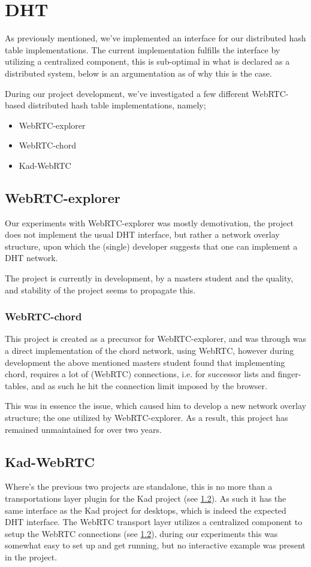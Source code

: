 \section{DHT}

As previously mentioned, we've implemented an interface for our distributed
hash table implementations. The current implementation fulfills the interface
by utilizing a centralized component, this is sub-optimal in what is declared
as a distributed system, below is an argumentation as of why this is the case.

During our project development, we've investigated a few different WebRTC-based
distributed hash table implementations, namely;
\begin{itemize}
\item WebRTC-explorer
\item WebRTC-chord
\item Kad-WebRTC
\end{itemize}

\subsection{WebRTC-explorer}
Our experiments with WebRTC-explorer was mostly demotivation, the project does
not implement the usual DHT interface, but rather a network overlay structure,
upon which the (single) developer suggests that one can implement a DHT network.

The project is currently in development, by a masters student and the quality,
and stability of the project seems to propagate this.

\subsubsection{WebRTC-chord}
This project is created as a precursor for WebRTC-explorer, and was through was
a direct implementation of the chord network, using WebRTC, however during 
development the above mentioned masters student found that implementing chord,
requires a lot of (WebRTC) connections, i.e. for successor lists and
finger-tables, and as such he hit the connection limit imposed by the browser.

This was in essence the issue, which caused him to develop a new network
overlay structure; the one utilized by WebRTC-explorer. As a result, this 
project has remained unmaintained for over two years.

\subsection{Kad-WebRTC}
Where's the previous two projects are standalone, this is no more than a 
transportations layer plugin for the Kad project (see \ref{}). As such it 
has the same interface as the Kad project for desktops, which is indeed the 
expected DHT interface. The WebRTC transport layer utilizes a centralized 
component to setup the WebRTC connections (see \ref{}), during our experiments
this was somewhat easy to set up and get running, but no interactive example
was present in the project.


